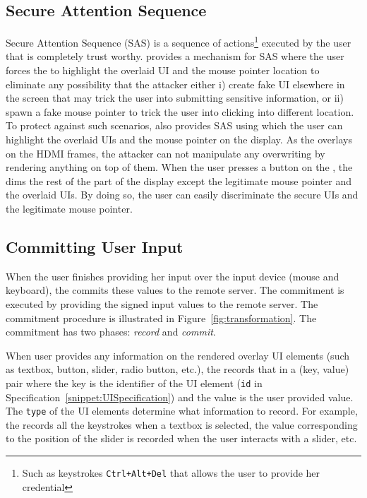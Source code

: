 \subsection{Secure Attention Sequence}
\label{sec:systemDesign:SAS}

Secure Attention Sequence (SAS) is a sequence of actions\footnote{Such as keystrokes \texttt{Ctrl+Alt+Del} that allows the user to provide her credential} executed by the user that is completely trust worthy. \name provides a mechanism for SAS where the user forces the \device to highlight the overlaid UI and the mouse pointer location to eliminate any possibility that the attacker either i) create fake UI elsewhere in the screen that may trick the user into submitting sensitive information, or ii) spawn a fake mouse pointer to trick the user into clicking into different location. To protect against such scenarios, \device also provides SAS using which the user can highlight the overlaid UIs and the mouse pointer on the display. As the \device overlays on the HDMI frames, the attacker can not manipulate any overwriting by rendering anything on top of them. When the user presses a button on the \device, the \device dims the rest of the part of the display except the legitimate mouse pointer and the overlaid UIs.
By doing so, the user can easily discriminate the secure UIs and the legitimate mouse pointer.


\subsection{Committing User Input}
\label{sec:systemDesign:commit}

When the user finishes providing her input over the input device (mouse and keyboard), the \device commits these values to the remote server. The commitment is executed by providing the signed input values to the remote server. The commitment procedure is illustrated in Figure~\ref{fig:transformation}. The commitment has two phases: \emph{record} and \emph{commit}.

 When user provides any information on the rendered overlay UI elements (such as textbox, button, slider, radio button, etc.), the \device records that in a (key, value) pair where the key is the identifier of the UI element (\texttt{id} in Specification~\ref{snippet:UISpecification}) and the value is the user provided value. The \texttt{type} of the UI elements determine what information to record. For example, the \device records all the keystrokes when a textbox is selected, the value corresponding to the position of the slider is recorded when the user interacts with a slider, etc.


